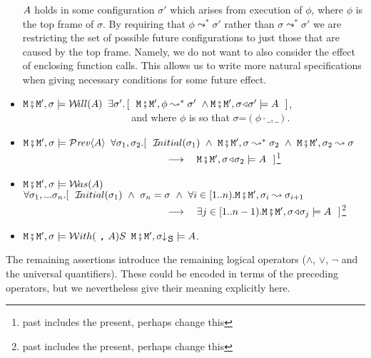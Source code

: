 \begin{definition}
\begin{itemize}
{$A$ holds in some configuration $\sigma'$ which arises from execution of $\phi$, where $\phi$ is the top frame of $\sigma$. By requiring that $\phi \leadsto^* \sigma' $ rather than
$\sigma \leadsto^* \sigma' $ we are restricting the set of possible future configurations to
just those that are caused by the top frame.
Namely, we do not want to also consider the effect of  enclosing function calls.
This allows us to write more natural specifications
when giving necessary conditions for some future effect.
}
\item
  ${\mbox{\tt{\ensuremath{{\mbox{\tt{M}}}}}}}\fatsemi {\mbox{\tt{\ensuremath{{\mbox{\tt{M}}}}}}}', \sigma \models  {{\mathcal W}\!ill}(A) $
  \IFF
  $\exists \sigma'.\, [\ \ {\mbox{\tt{\ensuremath{{\mbox{\tt{M}}}}}}}\fatsemi {\mbox{\tt{\ensuremath{{\mbox{\tt{M}}}}}}}',\phi \leadsto^* \sigma' \ \wedge {\mbox{\tt{\ensuremath{{\mbox{\tt{M}}}}}}}\fatsemi {\mbox{\tt{\ensuremath{{\mbox{\tt{M}}}}}}}',\sigma\!\triangleleft\!\sigma' \models A \ \  ]$,
 \\
$\strut ~ \hspace{1.4in} $  and where $\phi$ is
so that $\sigma$=$(\phi\cdot\_,\_)$.  
  \item
 ${\mbox{\tt{\ensuremath{{\mbox{\tt{M}}}}}}}\fatsemi {\mbox{\tt{\ensuremath{{\mbox{\tt{M}}}}}}}', \sigma \models  {\mathcal{P}}\textrm{\textit{rev}}\langle A\rangle $ \IFF
 $\forall \sigma_1, \sigma_2. [\ \ \Initial{\sigma_1}\ \wedge \   \M\mkpair \M', \sigma  \leadsto^*  \sigma_2 \ \wedge \   \M\mkpair \M', \sigma_2  \leadsto   \sigma  
$
 \\
$\strut ~ \hspace{1.9in} $  $ \longrightarrow \ \ \   
 {\mbox{\tt{\ensuremath{{\mbox{\tt{M}}}}}}}\fatsemi {\mbox{\tt{\ensuremath{{\mbox{\tt{M}}}}}}}', \sigma\!\triangleleft\!\sigma_2  \models A\ \
 ]$\footnote{past includes the present, perhaps change this}
 \item
 ${\mbox{\tt{\ensuremath{{\mbox{\tt{M}}}}}}}\fatsemi {\mbox{\tt{\ensuremath{{\mbox{\tt{M}}}}}}}', \sigma \models  {{\mathcal W}\!as}(A) $ \IFF
 $\forall \sigma_1, ... \sigma_n. [\ \ \Initial{\sigma_1}\ \wedge \  \sigma_n=\sigma 
  \ \wedge \ \forall i\in[1..n). \M\mkpair \M', \sigma_{i} \leadsto  \sigma_{i+1}
$
 \\
$\strut ~ \hspace{1.9in} $  $ \longrightarrow \ \ \  \exists j\in [1..n-1).
 {\mbox{\tt{\ensuremath{{\mbox{\tt{M}}}}}}}\fatsemi {\mbox{\tt{\ensuremath{{\mbox{\tt{M}}}}}}}', \sigma\!\triangleleft\!\sigma_j  \models A\ \
 ]$\footnote{past includes the present, perhaps change this}
 \item
 ${\mbox{\tt{\ensuremath{{\mbox{\tt{M}}}}}}}\fatsemi {\mbox{\tt{\ensuremath{{\mbox{\tt{M}}}}}}}', \sigma \models {\mathcal W}ith(\ {\mbox{\tt{,}}}\ A){S}$
 \IFF
 ${\mbox{\tt{\ensuremath{{\mbox{\tt{M}}}}}}}\fatsemi {\mbox{\tt{\ensuremath{{\mbox{\tt{M}}}}}}}', \sigma\!\!\downarrow\!_{{\mbox{\tt{S}}}} \models  A  $.
\end{itemize}

The remaining assertions introduce the remaining logical operators (\ie $\wedge$, $\vee$, $\neg$ and the universal quantifiers). These could be encoded in terms of the preceding operators, but we nevertheless give their meaning explicitly here.


\end{definition}
